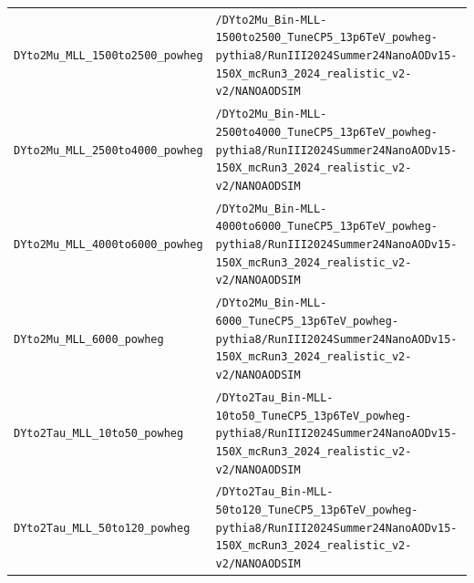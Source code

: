 \begin{longtable}{@{}>{\RaggedRight\arraybackslash}p{} >{\RaggedRight\arraybackslash}p{}@{}}
\addlinespace[2pt]
\texttt{DYto2Mu\_\allowbreak{}MLL\_\allowbreak{}1500to2500\_\allowbreak{}powheg} & \texttt{/\allowbreak{}DYto2Mu\_\allowbreak{}Bin-\allowbreak{}MLL-\allowbreak{}1500to2500\_\allowbreak{}TuneCP5\_\allowbreak{}13p6TeV\_\allowbreak{}powheg-\allowbreak{}pythia8/\allowbreak{}RunIII2024Summer24NanoAODv15-\allowbreak{}150X\_\allowbreak{}mcRun3\_\allowbreak{}2024\_\allowbreak{}realistic\_\allowbreak{}v2-\allowbreak{}v2/\allowbreak{}NANOAODSIM} \\
\addlinespace[2pt]
\texttt{DYto2Mu\_\allowbreak{}MLL\_\allowbreak{}2500to4000\_\allowbreak{}powheg} & \texttt{/\allowbreak{}DYto2Mu\_\allowbreak{}Bin-\allowbreak{}MLL-\allowbreak{}2500to4000\_\allowbreak{}TuneCP5\_\allowbreak{}13p6TeV\_\allowbreak{}powheg-\allowbreak{}pythia8/\allowbreak{}RunIII2024Summer24NanoAODv15-\allowbreak{}150X\_\allowbreak{}mcRun3\_\allowbreak{}2024\_\allowbreak{}realistic\_\allowbreak{}v2-\allowbreak{}v2/\allowbreak{}NANOAODSIM} \\
\addlinespace[2pt]
\texttt{DYto2Mu\_\allowbreak{}MLL\_\allowbreak{}4000to6000\_\allowbreak{}powheg} & \texttt{/\allowbreak{}DYto2Mu\_\allowbreak{}Bin-\allowbreak{}MLL-\allowbreak{}4000to6000\_\allowbreak{}TuneCP5\_\allowbreak{}13p6TeV\_\allowbreak{}powheg-\allowbreak{}pythia8/\allowbreak{}RunIII2024Summer24NanoAODv15-\allowbreak{}150X\_\allowbreak{}mcRun3\_\allowbreak{}2024\_\allowbreak{}realistic\_\allowbreak{}v2-\allowbreak{}v2/\allowbreak{}NANOAODSIM} \\
\addlinespace[2pt]
\texttt{DYto2Mu\_\allowbreak{}MLL\_\allowbreak{}6000\_\allowbreak{}powheg} & \texttt{/\allowbreak{}DYto2Mu\_\allowbreak{}Bin-\allowbreak{}MLL-\allowbreak{}6000\_\allowbreak{}TuneCP5\_\allowbreak{}13p6TeV\_\allowbreak{}powheg-\allowbreak{}pythia8/\allowbreak{}RunIII2024Summer24NanoAODv15-\allowbreak{}150X\_\allowbreak{}mcRun3\_\allowbreak{}2024\_\allowbreak{}realistic\_\allowbreak{}v2-\allowbreak{}v2/\allowbreak{}NANOAODSIM} \\
\addlinespace[2pt]
\texttt{DYto2Tau\_\allowbreak{}MLL\_\allowbreak{}10to50\_\allowbreak{}powheg} & \texttt{/\allowbreak{}DYto2Tau\_\allowbreak{}Bin-\allowbreak{}MLL-\allowbreak{}10to50\_\allowbreak{}TuneCP5\_\allowbreak{}13p6TeV\_\allowbreak{}powheg-\allowbreak{}pythia8/\allowbreak{}RunIII2024Summer24NanoAODv15-\allowbreak{}150X\_\allowbreak{}mcRun3\_\allowbreak{}2024\_\allowbreak{}realistic\_\allowbreak{}v2-\allowbreak{}v2/\allowbreak{}NANOAODSIM} \\
\addlinespace[2pt]
\texttt{DYto2Tau\_\allowbreak{}MLL\_\allowbreak{}50to120\_\allowbreak{}powheg} & \texttt{/\allowbreak{}DYto2Tau\_\allowbreak{}Bin-\allowbreak{}MLL-\allowbreak{}50to120\_\allowbreak{}TuneCP5\_\allowbreak{}13p6TeV\_\allowbreak{}powheg-\allowbreak{}pythia8/\allowbreak{}RunIII2024Summer24NanoAODv15-\allowbreak{}150X\_\allowbreak{}mcRun3\_\allowbreak{}2024\_\allowbreak{}realistic\_\allowbreak{}v2-\allowbreak{}v2/\allowbreak{}NANOAODSIM} \\

\end{longtable}
